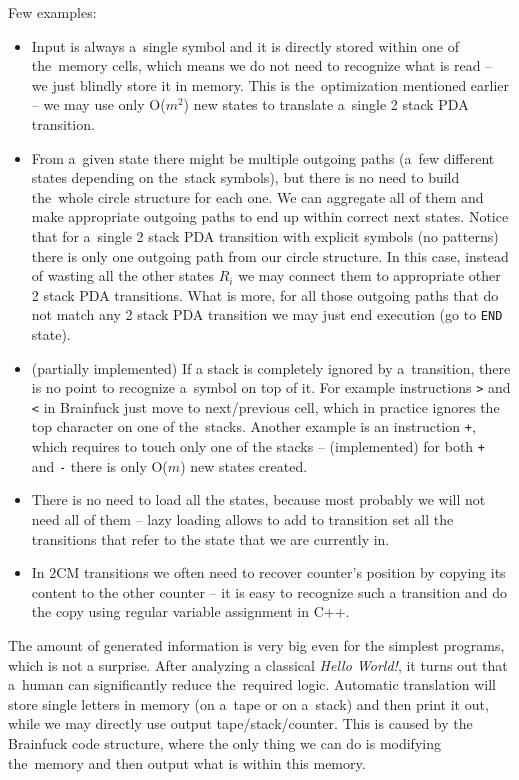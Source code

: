 \documentclass[english,shortabstract,mgr]{iithesis}
\begin{document}
Few examples:
\begin{itemize}
  \item Input is always a~single symbol and it is directly stored within one of the~memory cells,
      which means we do not need to recognize what is read -- we just blindly store it in memory.
      This is the~optimization mentioned earlier -- we may use only O($m^2$) new states to translate
      a~single 2 stack PDA transition.
  \item From a~given state there might be multiple outgoing paths (a~few different states depending
      on the~stack symbols), but there is no need to build the~whole circle structure for each one.
      We can aggregate all of them and make appropriate outgoing paths to end up within correct
      next states. Notice that for a~single 2 stack PDA transition with explicit symbols (no patterns)
      there is only one outgoing path from our circle structure. In this case, instead of wasting all
      the other states $R_i$ we may connect them to appropriate other 2 stack PDA transitions.
      What is more, for all those outgoing paths that do not match any 2 stack PDA transition
      we may just end execution (go to \texttt{END} state).
  \item (partially implemented) If a stack is completely ignored by a~transition, there is no point
      to recognize a~symbol on top of it. For example instructions \texttt{>} and \texttt{<}
      in Brainfuck just move to next/previous cell, which in practice ignores the top
      character on one of the~stacks. Another example is an instruction \texttt{+},
      which requires to touch only one of the stacks -- (implemented) for both
      \texttt{+} and \texttt{-} there is only O($m$) new states created.
  \item There is no need to load all the states, because most probably we will
      not need all of them -- lazy loading allows to add to transition set
      all the transitions that refer to the state that we are currently in.
  \item In $2$CM transitions we often need to recover counter's position by
      copying its content to the other counter -- it is easy to recognize such
      a transition and do the copy using regular variable assignment in C++.
\end{itemize}

The amount of generated information is very big even for the simplest programs, which is not a surprise.
After analyzing a classical \textit{Hello World!}, it turns out that a~human can
significantly reduce the~required logic. Automatic translation will store single letters
in memory (on a~tape or on a~stack) and then print it out, while we may directly use output
tape/stack/counter. This is caused by the Brainfuck code structure, where the only thing we can do
is modifying the~memory and then output what is within this memory.
\end{document}
